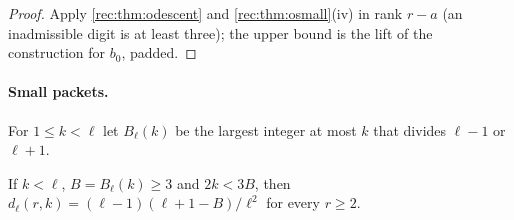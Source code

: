 \begin{proof}
Apply \cref{rec:thm:odescent} and \cref{rec:thm:osmall}(iv) in rank $r-a$ (an inadmissible digit is at least three); the
upper bound is the lift of the construction for $b_0$, padded.
\end{proof}

\paragraph{Small packets.}
For $1\le k<\ell$ let $B_\ell(k)$ be the largest integer at most $k$ that divides $\ell-1$ or $\ell+1$.

\begin{theorem}\label{rec:thm:oconic}
If $k<\ell$, $B=B_\ell(k)\ge3$ and $2k<3B$, then $d_\ell(r,k)=(\ell-1)(\ell+1-B)/\ell^2$ for every $r\ge2$.
\end{theorem}

